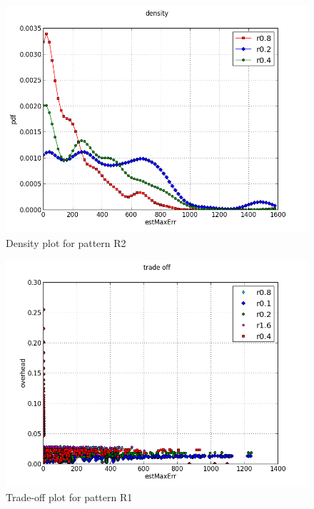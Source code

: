 \documentclass[a4paper, smallheadings,english]{scrartcl}
\begin{document}
\begin{figure}[h!]
    \begin{center}
        \includegraphics[scale=0.7]{plots/task1/density_R2}
    \end{center}
    \caption{Density plot for pattern R2}
    \label{fig:task1_density_r2}
\end{figure}
\begin{figure}[h!]
    \begin{center}
        \includegraphics[scale=0.7]{plots/task1/trade_off_R1}
    \end{center}
    \caption{Trade-off plot for pattern R1}
    \label{fig:task1_trade_off_r1}
\end{figure}
\end{document}
